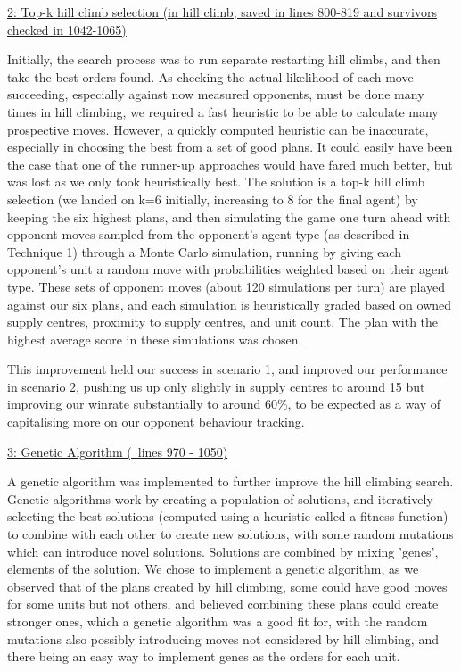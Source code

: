 \documentclass[12pt,a4paper]{article}
\begin{document}
\underline{2: Top-k hill climb selection (in hill climb, saved in lines 800-819 and survivors checked in 1042-1065)}

Initially, the search process was to run separate restarting hill climbs, and then take the best orders found. As checking the actual likelihood of each move succeeding, especially against now measured opponents, must be done many times in hill climbing, we required a
fast heuristic to be able to calculate many prospective moves. However, a quickly computed heuristic can be inaccurate, especially in choosing the best from a set of good plans.
It could easily have been the case that one of the runner-up approaches would have fared much better, but was lost as we only took heuristically best. The solution is a top-k hill climb selection (we landed on k=6 initially, increasing to 8 for the final agent) by keeping the six highest plans, and then simulating the game one turn ahead with opponent moves sampled from the opponent's agent type (as described in Technique 1) through a Monte Carlo simulation, running by giving each opponent's unit a random move with probabilities weighted based on
their agent type. These sets of opponent moves (about 120 simulations per turn) are played against our six plans, and each simulation is heuristically graded based on owned supply centres, proximity to supply centres, and unit count. The plan with the highest average score in these simulations was chosen. 

This improvement held our success in scenario 1, and improved our performance in scenario 2, pushing us up only slightly in supply centres to around 15 but improving our winrate substantially to around 60\%, to be expected as a way of capitalising 
more on our opponent behaviour tracking. 

\underline{3: Genetic Algorithm (~lines 970 - 1050)}

A genetic algorithm was implemented to further improve the hill climbing search. Genetic algorithms work by creating a population of solutions, and iteratively selecting the best solutions (computed using a heuristic called a fitness function)
to combine with each other to create new solutions, with some random mutations which can introduce novel solutions. Solutions are combined by mixing 'genes', elements of the solution. We chose to implement a genetic algorithm, as we observed that of the plans created by hill climbing, some could have good moves
for some units but not others, and believed combining these plans could create stronger ones, which a genetic algorithm was a good fit for, with the random mutations also possibly introducing moves not considered by hill climbing, and there being
an easy way to implement genes as the orders for each unit.
\end{document}
